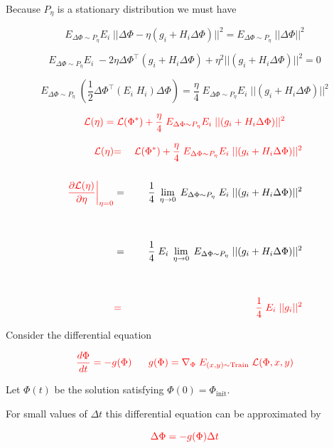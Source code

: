 {
Because $P_\eta$ is a stationary distribution we must have

$$E_{\Delta \Phi \sim P_\eta}E_i\; ||\Delta \Phi - \eta (g_i + H_i\Delta \Phi)||^2 = E_{\Delta \Phi \sim P_\eta}\; ||\Delta \Phi||^2$$

\vfill
$$E_{\Delta \Phi \sim P_\eta}E_i\;-2\eta \Delta \Phi^\top (g_i + H_i\Delta \Phi) +\eta^2||(g_i + H_i\Delta \Phi)||^2 = 0$$

\vfill
$$E_{\Delta \Phi \sim P_\eta}\;\left(\frac{1}{2}\Delta \Phi^\top (E_i \;H_i)\Delta \Phi\right) = \frac{\eta}{4}\;E_{\Delta \Phi \sim P_\eta}E_i \;||(g_i + H_i\Delta \Phi)||^2$$

\vfill
$${\color{red} {\cal L}(\eta)  = {\cal L}(\Phi^*) + \frac{\eta}{4}\;E_{\Delta \Phi \sim P_\eta}E_i \;||(g_i + H_i\Delta \Phi)||^2}$$


\begin{eqnarray*}
{\color{red} {\cal L}(\eta)}  & {\color{red} =} & {\color{red} {\cal L}(\Phi^*) + \frac{\eta}{4}\;E_{\Delta \Phi \sim P_\eta}E_i \;||(g_i + H_i\Delta \Phi)||^2} \\
\\
{\color{red} \left.\frac{\partial {\cal L}(\eta)}{\partial \eta}\right|_{\eta = 0}} & = & \frac{1}{4} \; \lim_{\eta \rightarrow 0} \; E_{\Delta \Phi \sim P_\eta}\; E_i \;||(g_i + H_i\Delta \Phi)||^2 \\
\\
\\
& = & \frac{1}{4} \; E_i\;\lim_{\eta \rightarrow 0}\;E_{\Delta \Phi \sim P_\eta} \;||(g_i + H_i\Delta \Phi)||^2 \\
\\
\\
& {\color{red} =} & {\color{red} \frac{1}{4}\; E_i\;||g_i||^2}
\end{eqnarray*}


Consider the differential equation

$${\color{red} \frac{d \Phi}{d t} = - g(\Phi) \;\;\;\;\;\; g(\Phi) = \nabla_\Phi\; E_{(x,y) \sim \mathrm{Train}}\;{\cal L}(\Phi,x,y)}$$

\vfill
Let $\Phi(t)$ be the solution satisfying $\Phi(0) = \Phi_{\mathrm{init}}$.

\vfill
For small values of $\Delta t$ this differential equation can be approximated by

\vfill
$${\color{red} \Delta \Phi = - g(\Phi)\Delta t}$$

}
